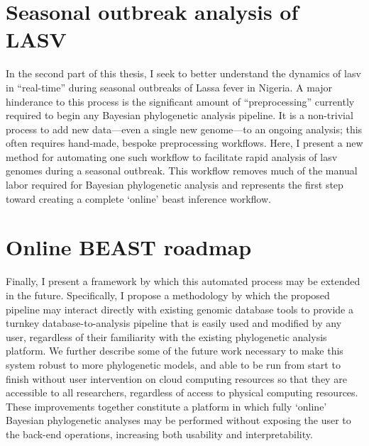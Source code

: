 \section{Seasonal outbreak analysis of LASV}

In the second part of this thesis, I seek to better understand the dynamics of \gls{lasv} in ``real-time'' during seasonal outbreaks of Lassa fever in Nigeria.
A major hinderance to this process is the significant amount of ``preprocessing'' currently required to begin any Bayesian phylogenetic analysis pipeline.
It is a non-trivial process to add new data---even a single new genome---to an ongoing analysis; this often requires hand-made, bespoke preprocessing workflows.
Here, I present a new method for automating one such workflow to facilitate rapid analysis of \gls{lasv} genomes during a seasonal outbreak.
This workflow removes much of the manual labor required for Bayesian phylogenetic analysis and represents the first step toward creating a complete `online' \gls{beast} inference workflow. 


\section{Online BEAST roadmap}

Finally, I present a framework by which this automated process may be extended in the future.
Specifically, I propose a methodology by which the proposed pipeline may interact directly with existing genomic database tools to provide a turnkey database-to-analysis pipeline that is easily used and modified by any user, regardless of their familiarity with the existing phylogenetic analysis platform.
We further describe some of the future work necessary to make this system robust to more phylogenetic models, and able to be run from start to finish without user intervention on cloud computing resources so that they are accessible to all researchers, regardless of access to physical computing resources.
These improvements together constitute a platform in which fully `online' Bayesian phylogenetic analyses may be performed without exposing the user to the back-end operations, increasing both usability and interpretability.


\cleardoublepage

